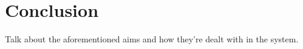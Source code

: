 \documentclass{standalone}
\begin{document}
	\section{Conclusion}
		Talk about the aforementioned aims and how they're dealt with in the system.
\end{document}
